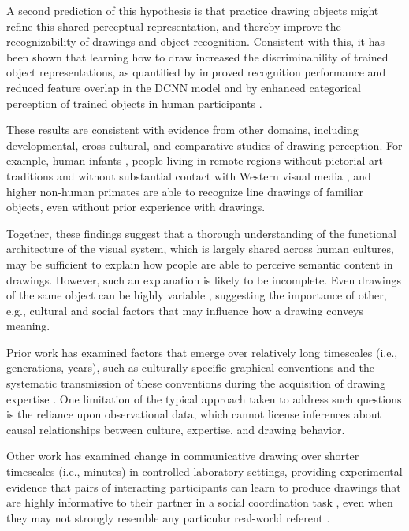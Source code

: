\documentclass[9pt,twocolumn,twoside]{pnas-new}
\begin{document}
A second prediction of this hypothesis is that practice drawing objects might refine this shared perceptual representation, and thereby improve the recognizability of drawings and object recognition. Consistent with this, it has been shown that learning how to draw increased the discriminability of trained object representations, as quantified by improved recognition performance and reduced feature overlap in the DCNN model and by enhanced categorical perception of trained objects in human participants \cite{fan2015common}.

These results are consistent with evidence from other domains, including developmental, cross-cultural, and comparative studies of drawing perception. For example, human infants \cite{hochberg1962pictorial}, people living in remote regions without pictorial art traditions and without substantial contact with Western visual media \cite{kennedy1975outline}, and higher non-human primates \cite{tanaka2007recognition} are able to recognize line drawings of familiar objects, even without prior experience with drawings.

Together, these findings suggest that a thorough understanding of the functional architecture of the visual system, which is largely shared across human cultures, may be sufficient to explain how people are able to perceive semantic content in drawings. However, such an explanation is likely to be incomplete. Even drawings of the same object can be highly variable \cite{quickdraw2017}, suggesting the importance of other, e.g., cultural and social factors that may influence how a drawing conveys meaning. 

Prior work has examined factors that emerge over relatively long timescales (i.e., generations, years), such as culturally-specific graphical conventions \cite{toku2001cross,boltz1994origin} and the systematic transmission of these conventions during the acquisition of drawing expertise \cite{kozbelt_ostrofsky_2018}. One limitation of the typical approach taken to address such questions is the reliance upon observational data, which cannot license inferences about causal relationships between culture, expertise, and drawing behavior. 

Other work has examined change in communicative drawing over shorter timescales (i.e., minutes) in controlled laboratory settings, providing experimental evidence that pairs of interacting participants can learn to produce drawings that are highly informative to their partner in a social coordination task \cite{Galantucci:2005uh}, even when they may not strongly resemble any particular real-world referent \cite{Garrod:2007wk,fay2010interactive}.
\end{document}
